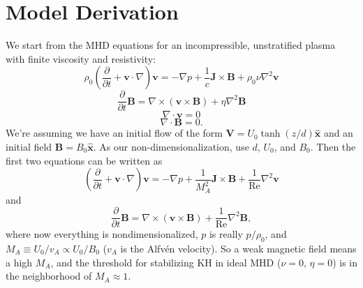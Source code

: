 \documentclass[aps,pop,preprint]{revtex4}
\renewcommand{\Re}{\mathrm{Re}}
\begin{document}
	
	\section{Model Derivation}
	\label{sec:derivation}
	We start from the MHD equations for an incompressible, unstratified plasma with finite viscosity and resistivity:
	\begin{equation}
	\rho_0 \left( \frac{\partial}{\partial t} + \mathbf{v} \cdot \nabla \right) \mathbf{v} = -\nabla p + \frac{1}{c} \mathbf{J} \times \mathbf{B} + \rho_0 \nu \nabla^2 \mathbf{v}
	\end{equation}
	\begin{equation}
	\frac{\partial}{\partial t} \mathbf{B} = \nabla \times (\mathbf{v} \times \mathbf{B}) + \eta \nabla^2 \mathbf{B}
	\end{equation}
	\begin{equation}
	\nabla \cdot \mathbf{v} = 0
	\end{equation}
	\begin{equation}
	\nabla \cdot \mathbf{B} = 0.
	\end{equation}
	We're assuming we have an initial flow of the form $\mathbf{V} = U_0 \tanh (z/d) \hat{\mathbf{x}}$ and an initial field $\mathbf{B} = B_0 \hat{\mathbf{x}}$. 
	As our non-dimensionalization, use $d$, $U_0$, and $B_0$. 
	Then the first two equations can be written as  %
	\begin{equation}
	\left( \frac{\partial}{\partial t} + \mathbf{v} \cdot \nabla \right) \mathbf{v} = -\nabla p + \frac{1}{M_A^2} \mathbf{J} \times \mathbf{B} + \frac{1}{\Re} \nabla^2 \mathbf{v}
	\end{equation}
	and
	\begin{equation}
	\frac{\partial}{\partial t} \mathbf{B} = \nabla \times (\mathbf{v} \times \mathbf{B}) + \frac{1}{\Re} \nabla^2 \mathbf{B},
	\end{equation}
	where now everything is nondimensionalized, $p$ is really $p/\rho_0$, and $M_A \equiv U_0/v_A \propto U_0/B_0$ ($v_A$ is the Alfv\'{e}n velocity). 
	So a weak magnetic field means a high $M_A$, and the threshold for stabilizing KH in ideal MHD ($\nu = 0$, $\eta = 0$) is in the neighborhood of $M_A \approx 1$.
	
\end{document}
